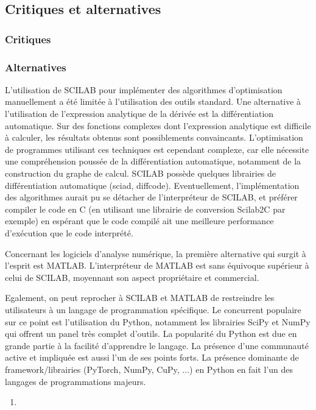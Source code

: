 \documentclass[3p, twocolumn]{elsarticle}
\begin{document}
\subsection{Critiques et alternatives}
\subsubsection{Critiques}
\subsubsection{Alternatives}

L'utilisation de SCILAB pour implémenter des algorithmes d'optimisation manuellement a été limitée à l'utilisation des outils standard. Une alternative à l'utilisation de l'expression analytique de la dérivée est la différentiation automatique. Sur des fonctions complexes dont l'expression analytique est difficile à calculer, les résultats obtenus sont possiblements convaincants. L'optimisation de programmes utilisant ces techniques est cependant complexe, car elle nécessite une compréhension poussée de la différentiation automatique, notamment de la construction du graphe de calcul. SCILAB possède quelques librairies de différentiation automatique (sciad, diffcode). Eventuellement, l'implémentation des algorithmes aurait pu se détacher de l'interpréteur de SCILAB, et préférer compiler le code en C (en utilisant une librairie de conversion Scilab2C par exemple) en espérant que le code compilé ait une meilleure performance d'exécution que le code interprété. 

Concernant les logiciels d'analyse numérique, la première alternative qui surgit à l'esprit est MATLAB. L'interpréteur de MATLAB est sans équivoque supérieur à celui de SCILAB, moyennant son aspect propriétaire et commercial. 

Egalement, on peut reprocher à SCILAB et MATLAB de restreindre les utilisateurs à un langage de programmation spécifique. Le concurrent populaire sur ce point est l'utilisation du Python, notamment les librairies SciPy et NumPy qui offrent un panel très complet d'outils. La popularité du Python est due en grande partie à la facilité d'apprendre le langage. La présence d'une communauté active et impliquée est aussi l'un de ses points forts. La présence dominante de framework/librairies (PyTorch, NumPy, CuPy, ...) en Python en fait l'un des langages de programmations majeurs.
\begin{enumerate}
    \item 
\end{enumerate}
\end{document}
